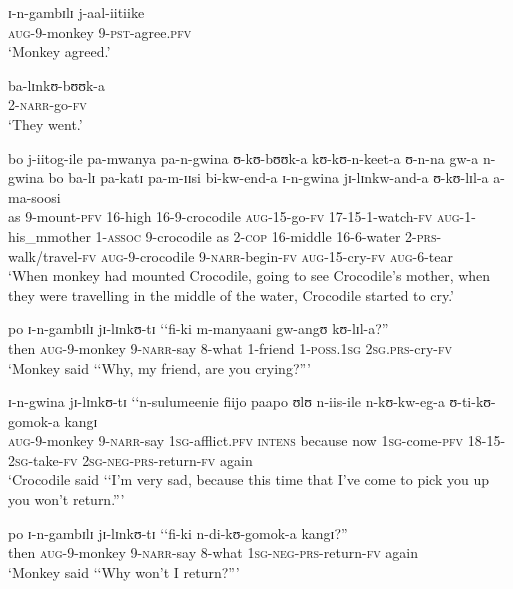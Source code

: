 \begin{exe}
\ex \gll ɪ-n-gambɪlɪ j-aal-iitiike\\
\textsc{aug}-9-monkey 9-\textsc{pst}-agree.\textsc{pfv}\\
\glt \lq Monkey agreed.'

\ex ba-lɪnkʊ-bʊʊk-a\\
2-\textsc{narr}-go-\textsc{fv}\\
\glt \lq They went.'

\ex \gll bo j-iitog-ile pa-mwanya pa-n-gwina ʊ-kʊ-bʊʊk-a kʊ-kʊ-n-keet-a ʊ-n-na gw-a n-gwina bo ba-lɪ pa-katɪ pa-m-ɪɪsi bi-kw-end-a ɪ-n-gwina jɪ-lɪnkw-and-a ʊ-kʊ-lɪl-a a-ma-soosi\\
as 9-mount-\textsc{pfv} 16-high 16-9-crocodile \textsc{aug}-15-go-\textsc{fv} 17-15-1-watch-\textsc{fv} \textsc{aug}-1-his\_mmother 1-\textsc{assoc} 9-crocodile as 2-\textsc{cop} 16-middle 16-6-water 2-\textsc{prs}-walk/travel-\textsc{fv} \textsc{aug}-9-crocodile 9-\textsc{narr}-begin-\textsc{fv} \textsc{aug}-15-cry-\textsc{fv} \textsc{aug}-6-tear\\
\glt \lq When monkey had mounted Crocodile, going to see Crocodile's mother, when they were travelling in the middle of the water, Crocodile started to cry.'

\ex \gll po ɪ-n-gambɪlɪ jɪ-lɪnkʊ-tɪ \lq\lq fi-ki m-manyaani gw-angʊ kʊ-lɪl-a?''\\
then \textsc{aug}-9-monkey 9-\textsc{narr}-say \phantom{\lq\lq}8-what 1-friend 1-\textsc{poss.1sg} \textsc{2sg.prs}-cry-\textsc{fv}\\
\glt \lq Monkey said \lq\lq Why, my friend, are you crying?''{}'

\ex \gll ɪ-n-gwina jɪ-lɪnkʊ-tɪ \lq\lq n-sulumeenie fiijo paapo ʊlʊ n-iis-ile n-kʊ-kw-eg-a ʊ-ti-kʊ-gomok-a kangɪ\\
\textsc{aug}-9-monkey 9-\textsc{narr}-say \phantom{\lq\lq}\textsc{1sg}-afflict.\textsc{pfv} \textsc{intens} because now \textsc{1sg}-come-\textsc{pfv} 18-15-\textsc{2sg}-take-\textsc{fv} \textsc{2sg}-\textsc{neg}-\textsc{prs}-return-\textsc{fv} again\\
\glt \lq Crocodile said \lq\lq I'm very sad, because this time that I've come to pick you up you won't return.''{}'

\ex \gll po ɪ-n-gambɪlɪ jɪ-lɪnkʊ-tɪ \lq\lq fi-ki n-di-kʊ-gomok-a kangɪ?''\\
then \textsc{aug}-9-monkey 9-\textsc{narr}-say \phantom{\lq\lq}8-what \textsc{1sg}-\textsc{neg}-\textsc{prs}-return-\textsc{fv} again\\
\glt \lq Monkey said \lq\lq Why won't I return?''{}'


\end{exe}

